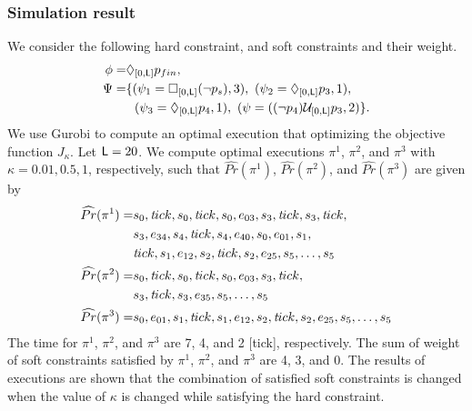 \documentclass[journal,twoside,web]{IEEEtran}
\renewcommand{\Pr}{\widehat{Pr}}
\newcommand{\tick}{{\sf tick}}
\newcommand{\ttick}{{\textit tick}}
\newcommand{\Len}{{\sf L}}
\newcommand{\U}[1]{\mathcal{U}_{[#1]}}
\newcommand{\F}[1]{\Diamond_{[#1]}}
\newcommand{\G}[1]{\Box_{[#1]}}
\begin{document}
\subsubsection{Simulation result}
%
We consider the following hard constraint, and soft constraints and their weight.
\begin{align}
\phi=&\F{0,\Len}p_{fin},\notag \\
\Psi 
=&\{
(\psi_1=\G{0,\Len}(\lnot p_s),3),~
(\psi_2=\F{0,\Len}p_3,1),\notag \\
&~~(\psi_3=\F{0,\Len}p_4,1),~
(\psi=((\lnot p_4) \U{0,\Len} p_3,2)
\}.\notag
\end{align}
%
We use Gurobi to compute an optimal execution that optimizing the objective function $J_\kappa$. 
Let $\Len=20$. We compute optimal executions $\pi^1$, $\pi^2$, and $\pi^3$ with $\kappa=0.01,0.5,1$, respectively, such that $\Pr(\pi^1)$, $\Pr(\pi^2)$, and $\Pr(\pi^3)$ are given by
\begin{align}
\Pr(\pi^1)=&
s_0,\ttick,s_0,\ttick,s_0,e_{03},s_3,\ttick,s_3,\ttick,\notag\\
&s_3,e_{34},s_4,\ttick,s_4,e_{40},s_0,e_{01},s_1,\notag\\
&\ttick,s_1,e_{12},s_2,\ttick,s_2,e_{25},s_5,\ldots,s_5\notag\\
\Pr(\pi^2)=&
s_0,\ttick,s_0,\ttick,s_0,e_{03},s_3,\ttick,\notag\\
&s_3,\ttick,s_3,e_{35},s_5,\ldots,s_5\notag \\
\Pr(\pi^3)=&s_0,e_{01},s_1,\ttick,s_1,e_{12},s_2,\ttick,s_2,e_{25},s_5,\ldots,s_5\notag
\end{align}
%
The time for $\pi^1$, $\pi^2$, and $\pi^3$ are 7, 4, and 2 [\tick], respectively.
The sum of weight of soft constraints satisfied by $\pi^1$, $\pi^2$, and $\pi^3$ are 4, 3, and 0.
The results of executions are shown that the combination of satisfied soft constraints is changed when the value of $\kappa$ is changed while satisfying the hard constraint.
%
%
%
%
\end{document}
